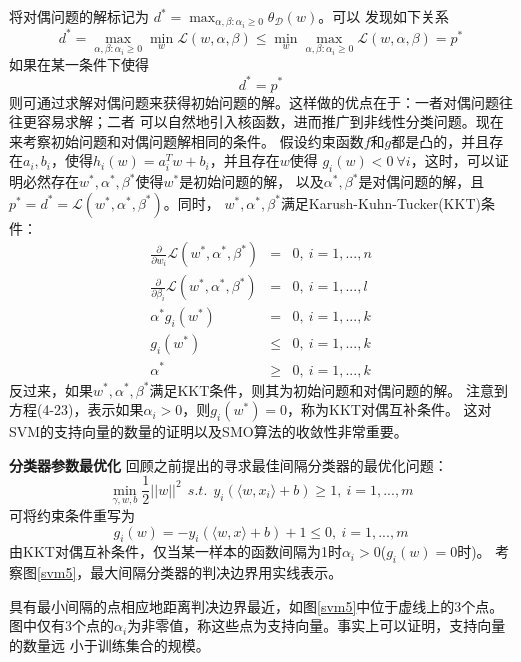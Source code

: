 将对偶问题的解标记为
$d^*=\max_{\alpha,\beta:\alpha_i\geq0}\theta_{\mathcal{D}}(w)$。可以
发现如下关系
\begin{equation}
    d^*=\max_{\alpha,\beta:\alpha_i\geq0}\min_w\mathcal{L}(w,\alpha,\beta)
    \leq\min_w\max_{\alpha,\beta:\alpha_i\geq0}\mathcal{L}(w,\alpha,\beta)=p^*
\end{equation}
如果在某一条件下使得
\begin{equation}
    d^*=p^*
\end{equation}
则可通过求解对偶问题来获得初始问题的解。这样做的优点在于：一者对偶问题往往更容易求解；二者
可以自然地引入核函数，进而推广到非线性分类问题。现在来考察初始问题和对偶问题解相同的条件。
假设约束函数$f$和$g$都是凸的，并且存在$a_i,b_i$，使得$h_i(w)=a_i^Tw+b_i$，并且存在$w$使得
$g_i(w)<0~\forall i$，这时，可以证明必然存在$w^*,\alpha^*,\beta^*$使得$w^*$是初始问题的解，
以及$\alpha^*,\beta^*$是对偶问题的解，且$p^*=d^*=\mathcal{L}(w^*,\alpha^*,\beta^*)$。同时，
$w^*,\alpha^*,\beta^*$满足Karush-Kuhn-Tucker(KKT)条件：
\begin{eqnarray}
    \frac{\partial}{\partial{}w_i}\mathcal{L}(w^*,\alpha^*,\beta^*)&=&0,~i=1,...,n\\
    \frac{\partial}{\partial{}\beta_i}\mathcal{L}(w^*,\alpha^*,\beta^*)&=&0,~i=1,...,l\\
    \alpha^*g_i(w^*)&=&0,~i=1,...,k\\
    g_i(w^*)&\leq&0,~i=1,...,k\\
    \alpha^*&\geq&0,~i=1,...,k
\end{eqnarray}
反过来，如果$w^*,\alpha^*,\beta^*$满足KKT条件，则其为初始问题和对偶问题的解。
注意到方程(4-23)，表示如果$\alpha_i>0$，则$g_i(w^*)=0$，称为KKT对偶互补条件。
这对SVM的支持向量的数量的证明以及SMO算法的收敛性非常重要。

\textbf{分类器参数最优化}
回顾之前提出的寻求最佳间隔分类器的最优化问题：
\begin{equation}
    \min_{\gamma,w,b}\frac{1}{2}||w||^2~~s.t.~~y_i(\langle{}w,x_i\rangle+b)\geq1,~i=1,...,m
\end{equation}
可将约束条件重写为
\begin{equation}
    g_i(w)=-y_i(\langle{}w,x\rangle+b)+1\leq0,~i=1,...,m
\end{equation}
由KKT对偶互补条件，仅当某一样本的函数间隔为1时$\alpha_i>0$($g_i(w)=0$时)。
考察图\ref{svm5}，最大间隔分类器的判决边界用实线表示。

具有最小间隔的点相应地距离判决边界最近，如图\ref{svm5}中位于虚线上的3个点。
图中仅有3个点的$\alpha_i$为非零值，称这些点为支持向量。事实上可以证明，支持向量的数量远
小于训练集合的规模。

